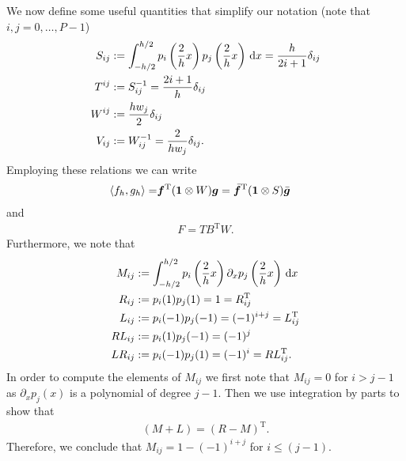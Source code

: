 We now define some useful quantities that simplify our notation (note that $i,j=0,\dots,P-1$)
\begin{subequations}
    \begin{align}
        S_{ij} &:= \int_{-h/2}^{h/2} p_i\left(\frac{2}{h} x\right)p_j\left(\frac{2}{h} x\right) \dx = \frac{h}{2i+1}\delta_{ij} \\%
        T^{ij} &:= S^{-1}_{ij} = \frac{2i+1}{h}\delta_{ij} \\%
        W^{ij} &:= \frac{h w_j}{2}\delta_{ij}\\
        V_{ij} &:= W_{ij}^{-1} = \frac{2}{hw_j}\delta_{ij}. 
    \end{align}
    \label{eq:diagonal}
\end{subequations}
Employing these relations we can write
    \begin{align}
		\langle f_h,g_h\rangle =& {\boldsymbol{f}}^{\mathrm{T}}(\mathbf{1}\otimes W){\boldsymbol{g}} 
		= \bar{{\boldsymbol{f}}}^{\mathrm{T}}(\mathbf{1}\otimes S)\bar{{\boldsymbol{g}}} 
    \end{align}
    and \begin{align}
        F = TB^{\mathrm{T}}W.
        \label{eq:transformation}
    \end{align}
Furthermore, we note that
\begin{subequations}
    \begin{align}
        M_{ij} &:= \int_{-h/2}^{h/2} p_i\left(\frac{2}{h} x\right)\partial_xp_j\left(\frac{2}{h} x\right) \,\mathrm{d}x\\
		R_{ij} &:= p_i(1)p_j(1) = 1 = R^{\mathrm{T}}_{ij}\\
		L_{ij} &:= p_i(-1)p_j(-1) = (-1)^{i+j} = L^{\mathrm{T}}_{ij}\\
        RL_{ij}&:= p_i(1)p_j(-1) = (-1)^j\\
		LR_{ij}&:= p_i(-1)p_j(1) = (-1)^i = RL^{\mathrm{T}}_{ij}.
    \end{align}
    \label{eq:legendre_operators}
\end{subequations}
In order to compute the elements of $M_{ij}$ we first note that $M_{ij} = 0$ for
$i > j-1$ as $\partial_x p_j(x)$ is a polynomial of degree $j-1$. Then
we use integration by parts to show that 
\begin{align}
	(M+L) = (R-M)^{\mathrm{T}}.
    \label{eq:legendre_derivative}
\end{align}
Therefore, we conclude that $M_{ij} = 1 - (-1)^{i+j}$ for $i\le (j-1)$. 

